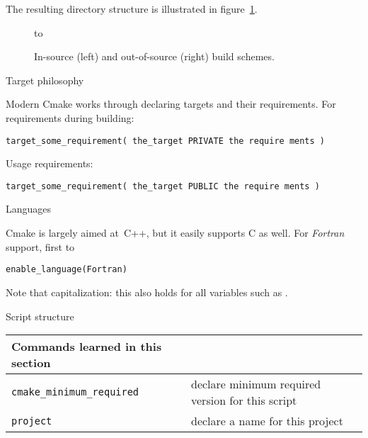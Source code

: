 The resulting directory structure is illustrated in figure~\ref{fig:cmake-buildinstall}.

\begin{figure}[ht]
  \hbox to \textwidth\bgroup
  \begin{minipage}{.45\textwidth}
  \end{minipage}
  \hss
  \begin{minipage}{.45\textwidth}
  \end{minipage}
  \egroup
  \caption{In-source (left) and out-of-source (right) build schemes.}
  \label{fig:cmake-buildinstall}
\end{figure}

 {Target philosophy}

Modern Cmake works through declaring targets and their requirements.
For requirements during building:
\begin{lstlisting}
target_some_requirement( the_target PRIVATE the require ments )
\end{lstlisting}
Usage requirements:
\begin{lstlisting}
target_some_requirement( the_target PUBLIC the require ments )
\end{lstlisting}

 {Languages}

Cmake is largely aimed at~C++, but it easily supports C as well.
For \emph{Fortran} support,
first to 
\begin{lstlisting}
enable_language(Fortran)
\end{lstlisting}
Note that capitalization: this also holds for all variables
such as .

 {Script structure}

\begin{tabular}{lp{3in}}
  \toprule
  Commands learned in this section\\
  \midrule
  \lstinline+cmake_minimum_required+&declare minimum required version for this script\\
  \lstinline+project+&declare a name for this project\\
  \bottomrule
\end{tabular}

